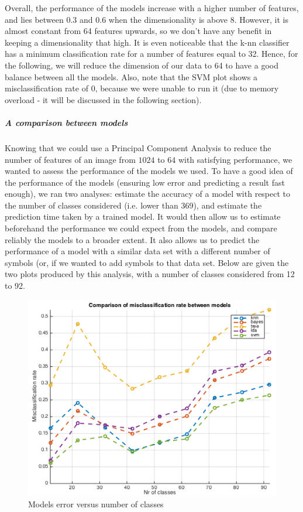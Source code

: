 \documentclass[twocolumn]{article}%
\begin{document}
	Overall, the performance of the models increase with a higher number of features, and lies between $0.3$ and $0.6$ when the dimensionality is above $8$. However, it is almost constant from 64 features upwards, so we don't have any benefit in keeping a dimensionality that high. It is even noticeable that the k-nn classifier has a minimum classification rate for a number of features equal to 32. Hence, for the following, we will reduce the dimension of our data to 64 to have a good balance between all the models. Also, note that the SVM plot shows a misclassification rate of 0, because we were unable to run it (due to memory overload - it will be discussed in the following section).
	
	
	\subparagraph{A comparison between models}
	Knowing that we could use a Principal Component Analysis to reduce the number of features of an image from $1024$ to $64$ with satisfying performance, we wanted to assess the performance of the models we used. To have a good idea of the performance of the models (ensuring low error and predicting a result fast enough), we ran two analyses: estimate the accuracy of a model with respect to the number of classes considered (i.e. lower than 369), and estimate the prediction time taken by a trained model. It would then allow us to estimate beforehand the performance we could expect from the models, and compare reliably the models to a broader extent. It also allows us to predict the performance of a model with a similar data set with a different number of symbols (or, if we wanted to add symbols to that data set. Below are given the two plots produced by this analysis, with a number of classes considered from 12 to 92.
	
	\begin{figure}[h!]
	\centering
	\includegraphics[scale=0.45]{images/error_vs_nclasses.png}
	\caption{Models error versus number of classes}
	\label{errorVSnClasses}
	\end{figure}
	
\end{document}
